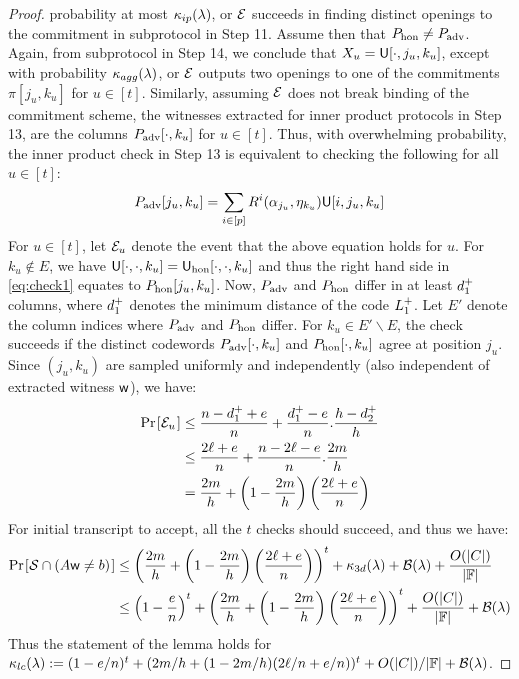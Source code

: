 \begin{proof}
probability at most $\kappa_{ip}(\lambda)$, or $\mathcal{E}$ succeeds in finding
distinct openings to the commitment in subprotocol in Step 11. Assume then that $P_{\rm hon}\neq
P_{\rm adv}$. Again, from subprotocol in Step 14, we conclude that $X_u =
\mathsf{U}[\cdot,j_u,k_u]$, except with probability $\kappa_{agg}(\lambda)$, or
$\mathcal{E}$ outputs two openings to one of the commitments $\pi[j_u,k_u]$ for $u\in
[t]$. Similarly, assuming $\mathcal{E}$ does not break binding of the commitment
scheme, the witnesses extracted for inner product protocols in Step 13, are the
columns $P_{\rm adv}[\cdot,k_u]$ for $u\in [t]$. Thus, with overwhelming probability, the inner product check in Step 13 is
equivalent to checking the following for all $u\in [t]$:
\begin{equation}\label{eq:check1}
P_{\rm adv}[j_u,k_u]=\sum_{i\in
[p]}R^i(\alpha_{j_u},\eta_{k_u})\mathsf{U}[i,j_u,k_u]
\end{equation}
For $u\in [t]$, let $\mathcal{E}_u$ denote the event that the above equation holds
for $u$. For $k_u\not\in E$, we have $\mathsf{U}[\cdot,\cdot,k_u]=\mathsf{U}_{\rm
hon}[\cdot,\cdot,k_u]$ and thus the right hand side in \eqref{eq:check1} equates
to $P_{\rm hon}[j_u,k_u]$. Now, $P_{\rm adv}$ and $P_{\rm hon}$ differ in at
least $d^{+}_1$ columns, where $d^{+}_1$ denotes the minimum distance of the
code $L^{+}_1$. Let $E'$ denote the column indices where $P_{\rm adv}$ and
$P_{\rm hon}$ differ. For $k_u\in E'\backslash E$, the check succeeds if the
distinct codewords $P_{\rm adv}[\cdot,k_u]$ and $P_{\rm hon}[\cdot,k_u]$ agree
at position $j_u$. Since $(j_u,k_u)$ are sampled uniformly and independently
(also independent of extracted witness $\mathsf{w}$), we have:
\begin{align}\label{eq:probeq6}
\prob{\mc{E}_u} &\leq \frac{n-\dashD_1+e}{n} +
\frac{\dashD_1-e}{n}.\frac{h-\dashD_2}{h}
\nonumber \\
	&\leq \frac{2\ell+e}{n} + \frac{n-2\ell-e}{n}.\frac{2m}{h} \nonumber \\
	& = \frac{2m}{h} +
\left(1-\frac{2m}{h}\right)\left(\frac{2\ell+e}{n}\right)
\end{align}
For initial transcript to accept, all the $t$ checks should succeed, and thus we
have:
\begin{align}\label{eq:probeq7}
\prob{\mc{S}\cap (A\wit\neq b)}&\leq
\left(\frac{2m}{h}+\left(1-\frac{2m}{h}\right)\left(\frac{2\ell+e}{n}\right)\right)^t
+ \kappa_{3d}(\secpar) + \mc{B}(\secpar) +
\frac{O(|C|)}{|\FF|} \nonumber \\
&\leq \left(1-\frac{e}{n}\right)^t +
\left(\frac{2m}{h}+\left(1-\frac{2m}{h}\right)\left(\frac{2\ell+e}{n}\right)\right)^t
+ \frac{O(|C|)}{|\FF|} + \mc{B}(\secpar)
\end{align}
Thus the statement of the lemma holds for $\kappa_{lc}(\lambda) := (1-e/n)^t +
(2m/h + (1-2m/h)(2\ell/n + e/n))^t+O(|C|)/|\mathbb{F}|+\mathcal{B}(\lambda)$.
\end{proof}

